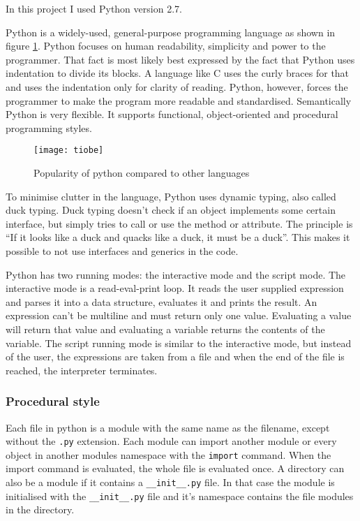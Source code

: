 In this project I used Python version 2.7.

Python is a widely-used, general-purpose programming language as shown in
figure \ref{python-popularity}. Python focuses on human readability, simplicity
and power to the programmer.\cite{website:python-zen,website:python-faq-creation-reason} That fact is most likely best expressed by the fact that Python uses indentation to divide its blocks. A
language like C uses the curly braces for that and uses the indentation only for
clarity of reading. Python, however, forces the programmer to make the program
more readable and standardised. Semantically Python is very flexible. It
supports functional, object-oriented and procedural programming styles.

\begin{figure}[htp]
\begin{center}
  \texttt{[image: tiobe]}
  \caption[Python popularity]{Popularity of python compared to other
  languages\cite{website:tiobe-index}}
  \label{python-popularity}
\end{center}
\end{figure}

To minimise clutter in the language, Python uses dynamic typing, also called
duck typing. Duck typing doesn't check if an object implements some certain
interface, but simply tries to call or use the method or attribute. The
principle is ``If it looks like a duck and quacks like a duck, it must be a
duck''.\cite[duck-typing]{website:python-glossary} This makes it possible to not use
interfaces and generics in the code.

Python has two running modes: the interactive mode and the script mode. The
interactive mode is a read-eval-print loop. It reads the user supplied
expression and parses it into a data structure, evaluates it and prints the
result. An expression can't be multiline and must return only one value.
Evaluating a value will return that value and evaluating a variable returns the
contents of the variable. The script running mode is similar to the interactive
mode, but instead of the user, the expressions are taken from a file and when
the end of the file is reached, the interpreter terminates.

\subsubsection{Procedural style}
Each file in python is a module with the same name as the filename, except without the \texttt{.py} extension. Each module can import another module or every object in another modules namespace with the \texttt{import} command. When the import command is evaluated, the whole file is evaluated once. A directory can also be a module if it contains a \texttt{\_\_init\_\_.py} file. In that case the module is initialised with the \texttt{\_\_init\_\_.py} file and it's namespace contains the file modules in the directory.

